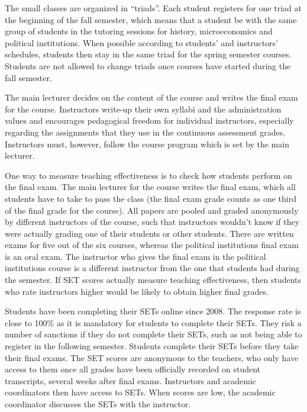 \documentclass[12pt]{article}
\begin{document}
The small classes are organized in ``triads''. Each student registers for one triad at the beginning of the fall semester, 
which means that a student be with the same group of students in the tutoring sessions for history, microeconomics and 
political institutions. When possible according to students' and instructors' schedules, students then stay in the same triad
for the spring semester courses. Students are not allowed to change triads once courses have started during the fall semester. 

The main lecturer decides on the content of the course and writes the final exam for the course. Instructors write-up their 
own syllabi and the administration values and encourages pedagogical freedom for individual instructors, especially regarding 
the assignments that they use in the continuous assessment grades. Instructors must, however, follow the course program which
is set by the main lecturer. 

One way to measure teaching effectiveness is to check how students perform on the final exam. 
The main lecturer for the course writes the final exam, which all students have to take to pass the class 
(the final exam grade counts as one third of the final grade for the course). 
All papers are pooled and graded anonymously by different instructors of the course, such that instructors wouldn't know 
if they were actually grading one of their students or other students. There are written exams for five out of the six 
courses, whereas the political institutions final exam is an oral exam. The instructor who gives the final exam in the 
political institutions course is a different instructor from the one that students had during the semester. 
If SET scores actually measure teaching effectiveness, then students who rate instructors higher would be likely to obtain
higher final grades. 

Students have been completing their SETs online since 2008. The response rate is close to 100\% as it is mandatory for 
students to complete their SETs. They risk a number of sanctions if they do not complete their SETs, such as not being able 
to register in the following semester. Students complete their SETs before they take their final exams. The SET scores are
anonymous to the teachers, who only have access to them once all grades have been officially recorded on student transcripts, 
several weeks after final exams. Instructors and academic coordinators then have access to SETs. When scores are low, the 
academic coordinator discusses the SETs with the instructor.   
\end{document}
